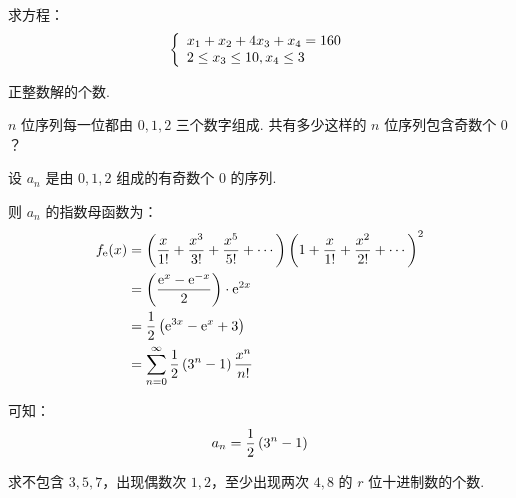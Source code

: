 \documentclass[cn, hazy, blue, normal, 12pt]{elegantnote}
\begin{document}
\begin{exercise}

    求方程：
    \begin{equation}
        \notag
        \left\{\begin{array}{l}
            x_{1}+x_{2}+4 x_{3}+x_{4}=160 \\
            2 \leq x_{3} \leq 10, x_{4} \leq 3
        \end{array}\right.
    \end{equation}

    正整数解的个数.

\end{exercise}

\begin{exercise}

    $n$ 位序列每一位都由 $0, 1, 2$ 三个数字组成. 共有多少这样的 $n$ 位序列包含奇数个 $0$？

\end{exercise}

\begin{solution}[print=true]

    设 $a_n$ 是由 $0, 1, 2$ 组成的有奇数个 $0$ 的序列.

    则 $a_n$ 的指数母函数为：
    \begin{equation}
        \notag
        \begin{aligned}
            f_{\mathrm{e}}(x)
             & = \left(\frac{x}{1!}+\frac{x^3}{3!}+\frac{x^5}{5!}+\cdots\right)
            \left(1+\frac{x}{1!}+\frac{x^2}{2!}+\cdots\right)^2                    \\
             & = \left(\frac{\mathrm{e}^{x}-\mathrm{e}^{-x}}{2}\right) \cdot
            \mathrm{e}^{2x}                                                        \\
             & = \frac{1}{2}\left(\mathrm{e}^{3x}-\mathrm{e}^{x}+3\right)          \\
             & =\sum_{n=0}^{\infty}{\frac{1}{2}\left(3^n - 1\right)\frac{x^n}{n!}}
        \end{aligned}
    \end{equation}

    可知：
    \begin{equation}
        \notag
        a_n = \frac{1}{2}\left(3^n - 1\right)
    \end{equation}

\end{solution}

\begin{exercise}

    求不包含 $3, 5, 7$，出现偶数次 $1, 2$，至少出现两次 $4, 8$ 的 $r$ 位十进制数的个数.

\end{exercise}
\end{document}
